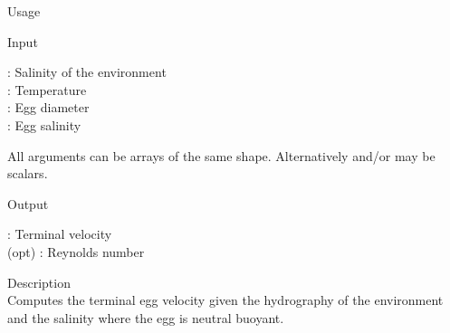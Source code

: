 {

\begin{tdesc}
\item[Usage] 
\item[Input]
  \begin{vartab}
    \>  : \> Salinity of the environment \> [psu]   \\
    \>  : \> Temperature                 \> [\degC] \\
    \>  : \> Egg diameter                \> [m]     \\
   \>  : \> Egg salinity                \> [psu]
  \end{vartab}
  All arguments can be arrays of the same shape.
  Alternatively  and/or  may be scalars.
\item[Output]
  \begin{vartab}
      \> : \> Terminal velocity  \> [\mps] \\
   (opt) \> : \> Reynolds number
  \end{vartab}
\item[Description]\mbox{}\\
  Computes the terminal egg velocity given the hydrography
  of the environment and the salinity  where the egg is
  neutral buoyant.
\end{tdesc}


}
